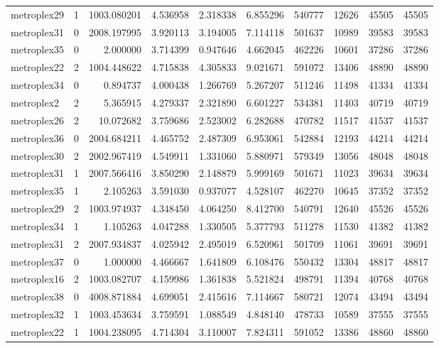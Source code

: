 \documentclass[../../../thesis.tex]{subfiles}
\begin{document}
\begin{longtable}{|l|r|r|r|r|r|r|r|r|r|}
metroplex29 & 1 & 1003.080201 & 4.536958 & 2.318338 & 6.855296 & 540777 & 12626 & 45505 & 45505 \\
metroplex31 & 0 & 2008.197995 & 3.920113 & 3.194005 & 7.114118 & 501637 & 10989 & 39583 & 39583 \\
metroplex35 & 0 & 2.000000 & 3.714399 & 0.947646 & 4.662045 & 462226 & 10601 & 37286 & 37286 \\
metroplex22 & 2 & 1004.448622 & 4.715838 & 4.305833 & 9.021671 & 591072 & 13406 & 48890 & 48890 \\
metroplex34 & 0 & 0.894737 & 4.000438 & 1.266769 & 5.267207 & 511246 & 11498 & 41334 & 41334 \\
metroplex2 & 2 & 5.365915 & 4.279337 & 2.321890 & 6.601227 & 534381 & 11403 & 40719 & 40719 \\
metroplex26 & 2 & 10.072682 & 3.759686 & 2.523002 & 6.282688 & 470782 & 11517 & 41537 & 41537 \\
metroplex36 & 0 & 2004.684211 & 4.465752 & 2.487309 & 6.953061 & 542884 & 12193 & 44214 & 44214 \\
metroplex30 & 2 & 2002.967419 & 4.549911 & 1.331060 & 5.880971 & 579349 & 13056 & 48048 & 48048 \\
metroplex31 & 1 & 2007.566416 & 3.850290 & 2.148879 & 5.999169 & 501671 & 11023 & 39634 & 39634 \\
metroplex35 & 1 & 2.105263 & 3.591030 & 0.937077 & 4.528107 & 462270 & 10645 & 37352 & 37352 \\
metroplex29 & 2 & 1003.974937 & 4.348450 & 4.064250 & 8.412700 & 540791 & 12640 & 45526 & 45526 \\
metroplex34 & 1 & 1.105263 & 4.047288 & 1.330505 & 5.377793 & 511278 & 11530 & 41382 & 41382 \\
metroplex31 & 2 & 2007.934837 & 4.025942 & 2.495019 & 6.520961 & 501709 & 11061 & 39691 & 39691 \\
metroplex37 & 0 & 1.000000 & 4.466667 & 1.641809 & 6.108476 & 550432 & 13304 & 48817 & 48817 \\
metroplex16 & 2 & 1003.082707 & 4.159986 & 1.361838 & 5.521824 & 498791 & 11394 & 40768 & 40768 \\
metroplex38 & 0 & 4008.871884 & 4.699051 & 2.415616 & 7.114667 & 580721 & 12074 & 43494 & 43494 \\
metroplex32 & 1 & 1003.453634 & 3.759591 & 1.088549 & 4.848140 & 478733 & 10589 & 37555 & 37555 \\
metroplex22 & 1 & 1004.238095 & 4.714304 & 3.110007 & 7.824311 & 591052 & 13386 & 48860 & 48860 \\

\end{longtable}
\end{document}
